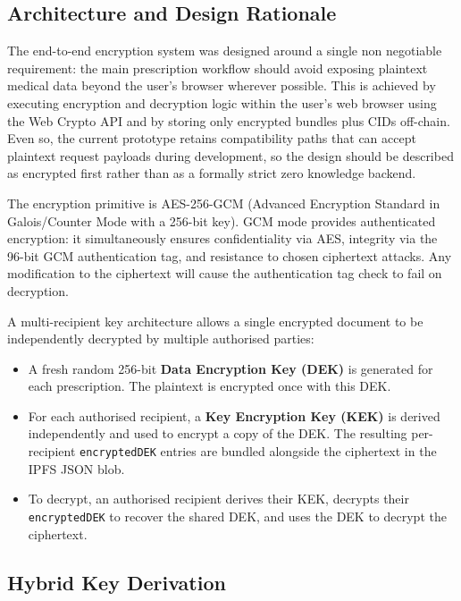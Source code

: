 \documentclass[12pt,a4wide]{report}
\begin{document}
\subsection{Architecture and Design Rationale}

The end-to-end encryption system was designed around a single non negotiable
requirement: the main prescription workflow should avoid exposing plaintext medical
data beyond the user's browser wherever possible. This is achieved by executing
encryption and decryption logic within the user's web browser using the Web Crypto
API and by storing only encrypted bundles plus CIDs off-chain. Even so, the
current prototype retains compatibility paths that can accept plaintext request
payloads during development, so the design should be described as encrypted first
rather than as a formally strict zero knowledge backend.

The encryption primitive is AES-256-GCM (Advanced Encryption Standard in
Galois/Counter Mode with a 256-bit key). GCM mode provides authenticated
encryption: it simultaneously ensures confidentiality via AES, integrity via the
96-bit GCM authentication tag, and resistance to chosen ciphertext attacks. Any
modification to the ciphertext will cause the authentication tag check to fail
on decryption.

A multi-recipient key architecture allows a single encrypted document to be
independently decrypted by multiple authorised parties:

\begin{itemize}
  \item A fresh random 256-bit \textbf{Data Encryption Key (DEK)} is generated
    for each prescription. The plaintext is encrypted once with this DEK.
  \item For each authorised recipient, a \textbf{Key Encryption Key (KEK)} is
    derived independently and used to encrypt a copy of the DEK. The resulting
    per-recipient \texttt{encryptedDEK} entries are bundled alongside the
    ciphertext in the IPFS JSON blob.
  \item To decrypt, an authorised recipient derives their KEK, decrypts their
    \texttt{encryptedDEK} to recover the shared DEK, and uses the DEK to decrypt
    the ciphertext.
\end{itemize}

\subsection{Hybrid Key Derivation}
\end{document}
